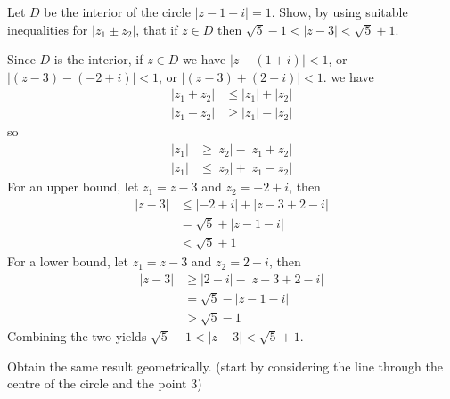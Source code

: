 \documentclass[12pt]{article}
\begin{document}
    \begin{question}
        Let $D$ be the interior of the circle $|z - 1 - i| = 1$.
        Show, by using suitable inequalities for $|z_{1} \pm z_{2}|$,
        that if $z \in D$ then $\sqrt{5} - 1 < |z - 3| < \sqrt{5} + 1$.
    \end{question}

    \begin{answer}
        Since $D$ is the interior, if $z \in D$ we have $|z - (1 + i)| < 1$,
        or $|(z - 3) - (-2 + i)| < 1$, or $|(z - 3) + (2 - i)| < 1$.
        we have
        \begin{align*}
            |z_{1} + z_{2}| &\le |z_{1}| + |z_{2}|\\
            |z_{1} - z_{2}| &\ge |z_{1}| - |z_{2}|
        \end{align*}
        so
        \begin{align*}
            |z_{1}| &\ge |z_{2}| - |z_{1} + z_{2}|\\
            |z_{1}| &\le |z_{2}| + |z_{1} - z_{2}|
        \end{align*}
        For an upper bound, let $z_{1} = z - 3$ and $z_{2} = -2 + i$, then
        \begin{align*}
            |z - 3| &\le |-2 + i| + |z - 3 + 2 - i|\\
                    &= \sqrt{5} + |z - 1 - i|\\
                    &< \sqrt{5} + 1
        \end{align*}
        For a lower bound, let $z_{1} = z - 3$ and $z_{2} = 2 - i$, then
        \begin{align*}
            |z - 3| &\ge |2 - i| - |z - 3 + 2 - i|\\
                    &= \sqrt{5} - |z - 1 - i|\\
                    &> \sqrt{5} - 1
        \end{align*}
        Combining the two yields $\sqrt{5} - 1 < |z - 3| < \sqrt{5} + 1$.
    \end{answer}

    \begin{subquestion}
        Obtain the same result geometrically.
        (start by considering the line through the centre
        of the circle and the point 3)
    \end{subquestion}
\end{document}
